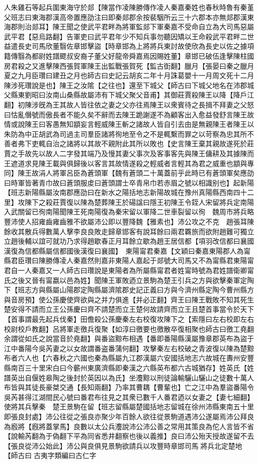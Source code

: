 人朱雞石等起兵圍東海守於郯【陳當作凌陳勝傳作凌人秦嘉秦姓也春秋時魯有秦堇父班志曰東海郡漢高帝置應劭注曰即秦郯郡余按裴駰所云三十六郡本亦無郯郡漢東海郡則治郯耳】陳王聞之使武平君畔為將軍監郯下軍秦嘉不受命自立為大司馬惡屬武平君【惡烏路翻】告軍吏曰武平君年少不知兵事勿聽因矯以王命殺武平君畔二世益遣長史司馬欣董翳佐章邯擊盜【時章邯為上將將兵東討故使欣為長史以佐之據項籍傳翳為都尉姓譜飂叔安裔子董父好龍帝舜嘉焉因賜姓董】章邯已破伍逢擊陳柱國房君殺之又進擊陳西張賀軍陳王出監戰張賀死【監古衘翻】臘月【張晏曰秦之臘月夏之九月臣瓚曰建丑之月也師古曰史記云胡亥二年十月誅葛嬰十一月周文死十二月陳涉死瓚說是也】陳王之汝隂【之往也】還至下城父【師古曰下城父地名在沛郡城父縣東劉昭曰汝南山桑縣故屬沛有下城父聚父音甫】其御莊賈殺陳王以降【降戶江翻】初陳涉旣為王其故人皆往依之妻之父亦往焉陳王以衆賓待之長揖不拜妻之父怒曰怙亂僭號而傲長者不能久矣不辭而去陳王跪謝遂不為顧客出入愈益發舒言陳王故情或說陳王曰客愚無知顓妄言輕威陳王斬之諸故人皆自引去由是無親陳王者陳王以朱防為中正胡武為司過主司羣臣諸將徇地至令之不是輒繫而罪之以苛察為忠其所不善者弗下吏輒自治之諸將以其故不親附此其所以敗也【史言陳王棄其親故遂死於莊賈之手故先以故人二字發其端乃及慢其妻父事次及客事客先與陳王傭耕及其據陳而王遮道求見陳王載與俱歸後以客言其故情遂殺之輕威者言輕其為君之威重也顓與專同】陳王故涓人將軍呂臣為蒼頭軍【魏有蒼頭二十萬蓋前乎此時已有蒼頭軍矣應劭曰時軍皆著青巾故曰蒼頭服䖍曰蒼頭謂士卒青帛巾若赤眉之號以相識别也】起新陽【班志新陽縣屬汝南郡應劭曰在新水之陽括地志新陽故城在豫州真陽縣西南四十二里】攻陳下之殺莊賈復以陳為楚葬陳王於碭諡曰隱王初陳王令銍人宋留將兵定南陽入武關留已徇南陽聞陳王死南陽復為秦宋留以軍降二世車裂留以徇　魏周市將兵略豐沛使人招雍齒雍齒雅不欲屬沛公即以豐降魏【雅素也】沛公攻之不克　趙張耳陳餘收其散兵得數萬人擊李良良敗走歸章邯客有說耳餘曰兩君覉旅而欲附趙難可獨立立趙後輔以誼可就功乃求得趙歇春正月耳餘立歇為趙王居信都【項羽改信都曰襄國漢復為信都縣屬信都國後漢復曰襄國】　東陽甯君秦嘉【文穎曰秦嘉東陽郡人為甯縣君臣瓚曰陳勝傳凌人秦嘉然則嘉非東陽人嘉起于郯號大司馬又不為甯縣君東陽甯君自一人秦嘉又一人師古曰瓚說是東陽者為所屬縣甯君者姓甯時號為君姓譜衛卿甯氏之後又晉有甯嬴以邑為姓】聞陳王軍敗迺立景駒為楚王引兵之方與欲擊秦軍定陶下【班志方與縣屬山陽郡定陶縣屬濟隂郡史記正義曰方與今濟州縣定陶今曹州縣方與音房預】使公孫慶使齊欲與之并力俱進【并必正翻】齊王曰陳王戰敗不知其死生楚安得不請而立王公孫慶曰齊不請楚而立王楚何故請齊而立王且楚首事當令於天下【首事謂最先起兵伐秦】田儋殺公孫慶秦左右校復攻陳下之【索隱曰左右校即左右校尉校戶教翻】呂將軍走徼兵復聚【如淳曰徼要也徼散卒復相聚也師古曰徼工堯翻余謂從如氏之說當音於堯翻】與番盜黥布相遇【番即番陽縣漢屬豫章郡英布為盜于江中番陽今吳芮妻之以女故謂番盗番蒲何翻】攻擊秦左右校破之青波復以陳為楚黥布者六人也【六春秋之六國也秦為縣屬九江郡漢屬六安國括地志六故城在夀州安豐縣南百三十里宋白曰今蘄州東廣濟縣即秦漢之六縣英布都六古城猶存】姓英氏【姓譜英出自偃姓皋陶之後封於英因以為氏】坐灋黥以刑徒論輸驪山驪山之徒數十萬人布皆與其徒長豪桀交通【長知兩翻】乃率其曹耦【曹輩也】亡之江中為羣盜番陽令吳芮甚得江湖間民心號曰番君布往見之其衆已數千人番君迺以女妻之【妻七細翻】使將其兵擊秦　楚王景駒在留【班志留縣屬楚國括地志留城在徐州沛縣東南五十里即張良封處】沛公往從之張良亦聚少年百餘人欲往從景駒道遇沛公遂屬焉沛公拜良為廏將【廐將蓋掌馬】良數以太公兵灋說沛公沛公善之常用其策良為佗人言皆不省【說輸芮翻為于偽翻下平為同省悉井翻察也後以義推】良曰沛公殆天授故遂留不去【張良從沛公始此】沛公與良俱見景駒欲請兵以攻豐時章邯司馬將兵北定楚地【師古曰古夷字類編曰古仁字
